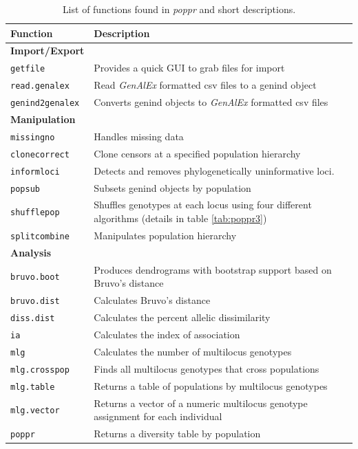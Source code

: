 \documentclass[double,12pt]{beavtex}
\begin{document}
  \begin{table}
  \caption{List of functions found in \textit{poppr} and short descriptions.}
  \label{tab:poppr1}
  \begin{tabular}{ll}
  \hline
  Function & Description \\ 
  \hline
  \textbf{Import/Export} & \\
  \texttt{getfile} & Provides a quick GUI to grab files for import \\
  \texttt{read.genalex} & Read \textit{GenAlEx} formatted csv files to a genind object \\
  \texttt{genind2genalex} & Converts genind objects to \textit{GenAlEx} formatted csv files \\
  \hline
  \textbf{Manipulation} & \\
  \texttt{missingno} & Handles missing data \\
  \texttt{clonecorrect} & Clone censors at a specified population hierarchy \\
  \texttt{informloci} & Detects and removes phylogenetically uninformative loci. \\
  \texttt{popsub} & Subsets genind objects by population \\
  \texttt{shufflepop} & Shuffles genotypes at each locus using four different algorithms (details in table \ref{tab:poppr3}) \\
  \texttt{splitcombine} & Manipulates population hierarchy \\ 
  \hline
  \textbf{Analysis} & \\
  \texttt{bruvo.boot} & Produces dendrograms with bootstrap support based on Bruvo's distance \\
  \texttt{bruvo.dist} & Calculates Bruvo's distance \\
  \texttt{diss.dist} & Calculates the percent allelic dissimilarity \\
  \texttt{ia} & Calculates the index of association \\
  \texttt{mlg} & Calculates the number of multilocus genotypes \\
  \texttt{mlg.crosspop} & Finds all multilocus genotypes that cross populations \\
  \texttt{mlg.table} & Returns a table of populations by multilocus genotypes \\
  \texttt{mlg.vector} & Returns a vector of a numeric multilocus genotype assignment for each individual \\
  \texttt{poppr} & Returns a diversity table by population \\

\end{tabular}
\end{table}
\end{document}
